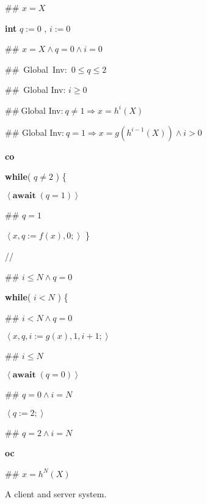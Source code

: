 \documentclass[11pt]{article}%
\begin{document}
\begin{figure}[tb!]%


\begin{code}
\#\# $x=X$

\textbf{int} $q:=0$ , $i:=0$

\#\# $x=X\wedge q=0\wedge i=0$

\#\#\ Global\ Inv:\ $0\leq q\leq2$

\#\#\ Global Inv: $i\geq0$

\#\#$\ $Global Inv:$\ q\neq1\Rightarrow x=h^{i}(X)$

\#\# Global Inv:$\ q=1\Rightarrow x=g(h^{i-1}(X))\wedge i>0$

\textbf{co}

\begin{indent}
\item \textbf{while}( $q\neq2$ ) \{

\begin{indent}
\item $\left\langle \mathbf{await\;}(q=1)\right\rangle $

\item \#\# $q=1$

\item $\left\langle x,q:=f(x),0;\right\rangle $ \}
\end{indent}
\end{indent}

//

\begin{indent}
\item \#\# $i\leq N\wedge q=0$

\item \textbf{while}( $i<N$ ) \{

\begin{indent}
\item \#\# $i<N\wedge q=0$

\item $\left\langle x,q,i:=g(x),1,i+1;\right\rangle $

\item \#\# $i\leq N$

\item $\left\langle \mathbf{await\;}(q=0)\right\rangle $
\end{indent}

\item \#\# $q=0\wedge i=N$

\item $\left\langle q:=2;\right\rangle $

\item \#\# $q=2\wedge i=N$
\end{indent}

\textbf{oc}

\#\# $x=h^{N}(X)$
\end{code}

%

\caption{A client and server system.}\label{cs}\end{figure}%
\end{document}
